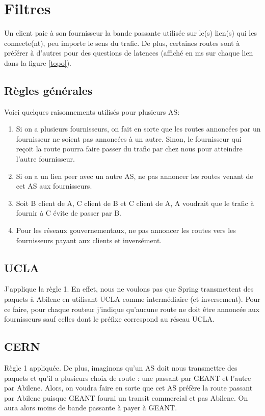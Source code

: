 \documentclass[a4paper, 12pt]{article}
\begin{document}
\section{Filtres}
Un client paie à son fournisseur la bande passante utilisée sur le(s) lien(s) qui les connecte(nt), peu importe le sens du trafic.
De plus, certaines routes sont à préférer à d'autres pour des questions de latences (affiché en ms sur chaque lien dans la figure \ref{topo}).
\subsection{Règles générales}
Voici quelques raisonnements utilisés pour plusieurs AS:
\begin{enumerate}
 \item Si on a plusieurs fournisseurs, on fait en sorte que les routes annoncées par un fournisseur ne soient pas annoncées à un autre.
 Sinon, le fournisseur qui reçoit la route pourra faire passer du trafic par chez nous pour atteindre l'autre fournisseur.
 \item Si on a un lien peer avec un autre AS, ne pas annoncer les routes venant de cet AS aux fournisseurs.
 \item Soit B client de A, C client de B et C client de A, A voudrait que le trafic à fournir à C évite de passer par B. %
 \item Pour les réseaux gouvernementaux, ne pas annoncer les routes vers les fournisseurs payant aux clients et inversément.
\end{enumerate}

\subsection{UCLA}
J'applique la règle 1.
En effet, nous ne voulons pas que Spring transmettent des paquets à Abilene en utilisant UCLA comme intermédiaire (et inversement).
Pour ce faire, pour chaque routeur j'indique qu'aucune route ne doit être annoncée aux fournisseurs sauf celles dont le préfixe correspond au réseau UCLA.

\subsection{CERN}
Règle 1 appliquée. De plus,
imaginons qu'un AS doit nous transmettre des paquets et qu'il a plusieurs choix de route : une passant par GEANT et l'autre par Abilene.
Alors, on voudra faire en sorte que cet AS préfère la route passant par Abilene puisque GEANT fourni un transit commercial et pas Abilene.
On aura alors moins de bande passante à payer à GEANT.
\\
\end{document}
